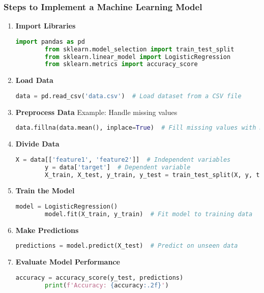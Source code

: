 \documentclass{beamer}
\begin{document}
\begin{frame}[fragile]
    \frametitle{Steps to Implement a Machine Learning Model}
    
    \begin{enumerate}
        \item \textbf{Import Libraries}
        \begin{lstlisting}[language=Python]
        import pandas as pd
        from sklearn.model_selection import train_test_split
        from sklearn.linear_model import LogisticRegression
        from sklearn.metrics import accuracy_score
        \end{lstlisting}

        \item \textbf{Load Data}
        \begin{lstlisting}[language=Python]
        data = pd.read_csv('data.csv')  # Load dataset from a CSV file
        \end{lstlisting}

        \item \textbf{Preprocess Data}
        Example: Handle missing values
        \begin{lstlisting}[language=Python]
        data.fillna(data.mean(), inplace=True)  # Fill missing values with mean
        \end{lstlisting}

        \item \textbf{Divide Data}
        \begin{lstlisting}[language=Python]
        X = data[['feature1', 'feature2']]  # Independent variables
        y = data['target']  # Dependent variable
        X_train, X_test, y_train, y_test = train_test_split(X, y, test_size=0.2, random_state=42)
        \end{lstlisting}

        \item \textbf{Train the Model}
        \begin{lstlisting}[language=Python]
        model = LogisticRegression()
        model.fit(X_train, y_train)  # Fit model to training data
        \end{lstlisting}

        \item \textbf{Make Predictions}
        \begin{lstlisting}[language=Python]
        predictions = model.predict(X_test)  # Predict on unseen data
        \end{lstlisting}

        \item \textbf{Evaluate Model Performance}
        \begin{lstlisting}[language=Python]
        accuracy = accuracy_score(y_test, predictions)
        print(f'Accuracy: {accuracy:.2f}')
        \end{lstlisting}
    \end{enumerate}
\end{frame}
\end{document}
